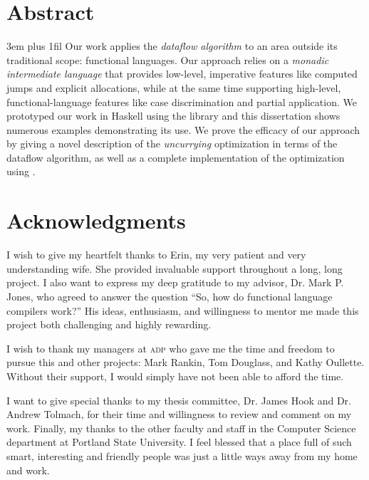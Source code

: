 \section*{Abstract}
{%
\parfillskip 3em plus 1fil%
Our work applies the \emph{dataflow algorithm} to an area outside its
traditional scope: functional languages. Our approach relies on
a \emph{monadic intermediate language} that provides low-level,
imperative features like computed jumps and explicit allocations,
while at the same time supporting high-level, functional-language
features like case discrimination and partial application. We
prototyped our work in Haskell using the \hoopl library and this
dissertation shows numerous examples demonstrating its use. We prove
the efficacy of our approach by giving a novel description of
the \emph{uncurrying} optimization in terms of the dataflow algorithm, as
well as a complete implementation of the optimization using \hoopl.\par}
\newpage

\section*{Acknowledgments}
I wish to give my heartfelt thanks to Erin, my very patient and very understanding
wife. She provided invaluable support throughout a long, long
project. I also want to express my deep gratitude to my advisor, Dr. Mark P. Jones, who
agreed to answer the question ``So, how do functional language compilers
work?'' His ideas, enthusiasm, and willingness to mentor me made this
project both challenging and highly rewarding. 

I wish to thank my managers at \textsc{adp} who gave me the time and
freedom to pursue this and other projects: Mark Rankin, Tom Douglass,
and Kathy Oullette. Without their support, I would simply have not
been able to afford the time.

I want to give special thanks to my thesis committee, Dr. James Hook
and Dr. Andrew Tolmach, for their time and willingness to review and
comment on my work. Finally, my thanks to the other faculty and staff in the
Computer Science department at Portland State University. I feel
blessed that a place full of such smart, interesting and friendly
people was just a little ways away from my home and work.

\newpage

\singlespacing
\tableofcontents
\newpage
{}
\listoffigures
\newpage


